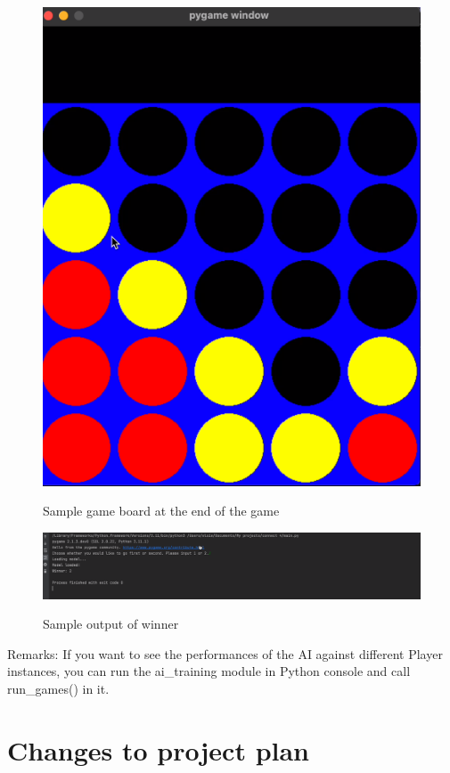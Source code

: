 \documentclass{article}
\begin{document}
\begin{enumerate}
\begin{figure}[H]
        \includegraphics[scale=0.6]{images/output.png}
        \par Sample game board at the end of the game
    \end{figure}
    \begin{figure}[H]
        \centering
        \includegraphics[scale=0.5]{images/output2.png}
        \par Sample output of winner
    \end{figure}
\end{enumerate}

Remarks: If you want to see the performances of the AI against different Player instances, you can run the ai\_training module in Python console and call run\_games() in it.

\section{Changes to project plan}
\end{document}
